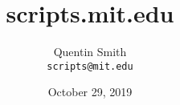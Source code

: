 \documentclass{beamer}
\title{scripts.mit.edu}
\author{Quentin Smith \\ \texttt{scripts@mit.edu}}
\institute{Student Information Processing Board}
\date{October 29, 2019}
\begin{document}
\begin{frame}
    \titlepage
\end{frame}















\end{document}

